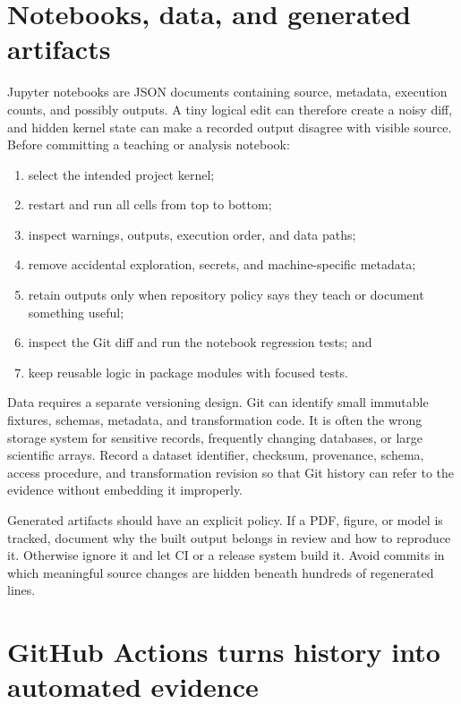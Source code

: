 \section{Notebooks, data, and generated artifacts}

Jupyter notebooks are JSON documents containing source, metadata, execution
counts, and possibly outputs. A tiny logical edit can therefore create a noisy
diff, and hidden kernel state can make a recorded output disagree with visible
source. Before committing a teaching or analysis notebook:

\begin{enumerate}
  \item select the intended project kernel;
  \item restart and run all cells from top to bottom;
  \item inspect warnings, outputs, execution order, and data paths;
  \item remove accidental exploration, secrets, and machine-specific metadata;
  \item retain outputs only when repository policy says they teach or document
  something useful;
  \item inspect the Git diff and run the notebook regression tests; and
  \item keep reusable logic in package modules with focused tests.
\end{enumerate}

Data requires a separate versioning design. Git can identify small immutable
fixtures, schemas, metadata, and transformation code. It is often the wrong
storage system for sensitive records, frequently changing databases, or large
scientific arrays. Record a dataset identifier, checksum, provenance, schema,
access procedure, and transformation revision so that Git history can refer to
the evidence without embedding it improperly.

Generated artifacts should have an explicit policy. If a PDF, figure, or model
is tracked, document why the built output belongs in review and how to reproduce
it. Otherwise ignore it and let CI or a release system build it. Avoid commits in
which meaningful source changes are hidden beneath hundreds of regenerated
lines.

\section{GitHub Actions turns history into automated evidence}

